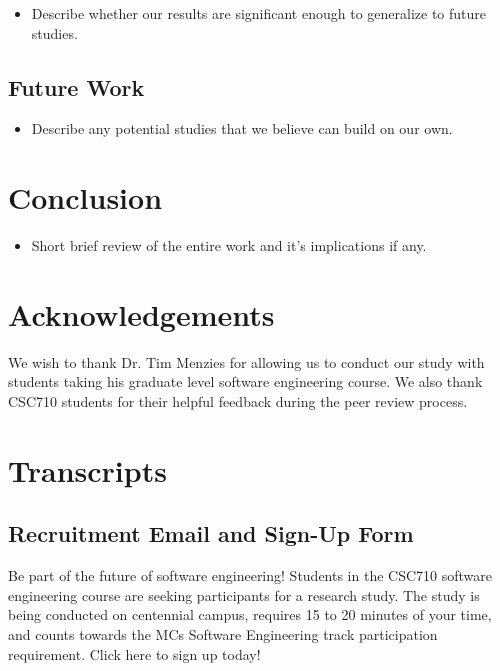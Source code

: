 \documentclass{sig-alternate-05-2015}
\begin{document}
\begin{itemize}
    \item Describe whether our results are significant enough to generalize to future studies.
\end{itemize}

\subsection{Future Work}

\begin{itemize}
    \item Describe any potential studies that we believe can build on our own.
\end{itemize}

\section{Conclusion}
\begin{itemize}
    \item Short brief review of the entire work and it's implications if any.
\end{itemize}

\section*{Acknowledgements}
We wish to thank Dr. Tim Menzies for allowing us to conduct our study with students taking his graduate level software engineering course. We also thank CSC710 students for their helpful feedback during the peer review process. 




\newpage
\appendix

\section{Transcripts}

\subsection{Recruitment Email and Sign-Up Form}

\noindent Be part of the future of software engineering! Students in the CSC710 software engineering course are seeking participants for a research study. The study is being conducted on centennial campus, requires 15 to 20 minutes of your time, and counts towards the MCs Software Engineering track participation requirement. Click here to sign up today!\\
\end{document}
